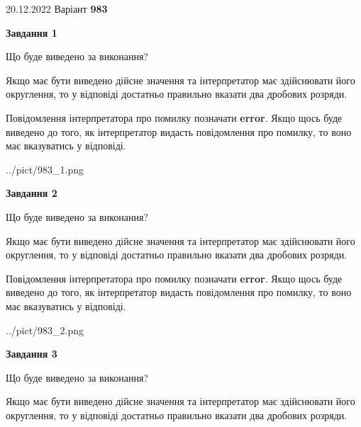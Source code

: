 \documentclass[12pt, ukrainian]{article}
\begin{document}
{20.12.2022 Варіант \No \textbf { 983 }\par}
{
\begin {Large}

{\begin {center}\textbf{Завдання 1}\end {center}}\par
Що буде виведено за виконання? \par

Якщо має бути виведено дійсне значення та інтерпретатор має здійснювати його округлення, 
то у відповіді достатньо правильно вказати два дробових розряди.

Повідомлення інтерпретатора про помилку позначати \textbf{error}.
Якщо щось буде виведено до того, як інтерпретатор видасть повідомлення про помилку, 
то воно має вказуватись у відповіді. \par

\begin{center}
	{../pict/983_1.png}
\end{center}
\newpage

{\begin {center}\textbf{Завдання 2}\end {center}}\par
Що буде виведено за виконання? \par

Якщо має бути виведено дійсне значення та інтерпретатор має здійснювати його округлення, 
то у відповіді достатньо правильно вказати два дробових розряди.

Повідомлення інтерпретатора про помилку позначати \textbf{error}.
Якщо щось буде виведено до того, як інтерпретатор видасть повідомлення про помилку, 
то воно має вказуватись у відповіді. \par

\begin{center}
	{../pict/983_2.png}
\end{center}
\newpage

{\begin {center}\textbf{Завдання 3}\end {center}}\par
Що буде виведено за виконання? \par

Якщо має бути виведено дійсне значення та інтерпретатор має здійснювати його округлення, 
то у відповіді достатньо правильно вказати два дробових розряди.


\end{Large}}
\end{document}
